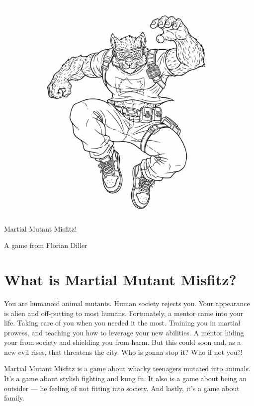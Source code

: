 \documentclass{book}
\begin{document}

\vspace*{\fill}

\begin{figure}[tph!]
\centering\includegraphics[width=12cm]{images/frontCover.png}
\end{figure}
\centering\Huge{}Martial Mutant Misfitz!
\normalfont\large

A game from Florian Diller

\newpage
{}
\raggedright
\chapter*{What is Martial Mutant Misfitz?}
\normalfont\large You are humanoid animal mutants. Human society rejects you. Your appearance is alien and off-putting to most humans. Fortunately, a mentor came into your life. Taking care of you when you needed it the most. Training you in martial prowess, and teaching you how to leverage your new abilities. A mentor hiding your from society and shielding you from harm. But this could soon end, as a new evil rises, that threatens the city. Who is gonna stop it? Who if not you?!

Martial Mutant Misfitz is a game about whacky teenagers mutated into animals. It's a game about stylish fighting and kung fu. It also is a game about being an outsider --- he feeling of not fitting into society. And lastly, it's a game about family.
\end{document}
